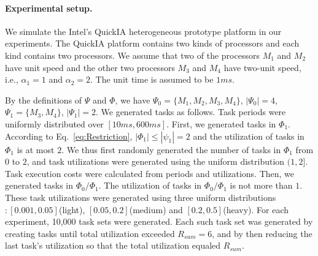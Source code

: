 \documentclass[Times, 10pt,twocolumn]{article}
\theoremstyle{definition}
\begin{document}
\paragraph{Experimental setup.} We simulate the Intel's QuickIA heterogeneous prototype platform \cite{chitlur2012quickia} in our experiments. The QuickIA platform contains two kinds of processors and each kind contains two processors. We assume that two of the processors $M_1$ and $M_2$ have unit speed and the other two processors $M_3$ and $M_4$ have two-unit speed, i.e., $\alpha_1 =1$ and $\alpha_2 = 2$. The unit time is assumed to be $1 ms$.



By the definitions of $\Psi$ and $\varPhi$, we have $\Psi_0= \{ M_1, M_2, M_3, M_4 \}$, $|\Psi_0| = 4$, $\Psi_1= \{M_3, M_4\}$, $|\Psi_1| = 2$. We generated tasks as follows. Task periods were uniformly distributed over $[10ms, 600ms]$. First, we generated tasks in $\varPhi_1$. According to Eq.~\ref{eq:Restriction},  $|\varPhi_1| \leq |\psi_1| = 2$ and the utilization of tasks in $\varPhi_1$ is at most $2$. We thus first randomly generated the number of tasks in $\varPhi_1$ from $0$ to $2$, and task utilizations were generated using the uniform distribution $(1, 2]$. Task execution costs were calculated from periods and utilizations. Then, we generated tasks in $\varPhi_0/\varPhi_1$. The utilization of tasks in $\varPhi_0/\varPhi_1$ is not more than $1$. These task utilizations were generated using three uniform distributions$: [0.001, 0.05]$(light), $[0.05, 0.2]$(medium) and $[0.2, 0.5]$(heavy). For each experiment, 10,000 task sets were generated. Each such task set was generated by creating tasks until total utilization exceeded $R_{sum}=6$, and by then reducing the last task's utilization so that the total utilization equaled $R_{sum}$.
\end{document}
